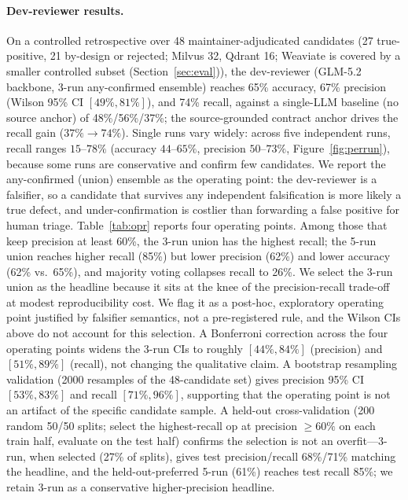 \documentclass[sigconf]{acmart}
\begin{document}
\paragraph{Dev-reviewer results.}
On a controlled retrospective over 48 maintainer-adjudicated candidates (27 true-positive, 21 by-design or rejected; Milvus 32, Qdrant 16; Weaviate is covered by a smaller controlled subset (Section~\ref{sec:eval})), the dev-reviewer (GLM-5.2 backbone, 3-run any-confirmed ensemble) reaches 65\% accuracy, 67\% precision (Wilson 95\% CI $[49\%, 81\%]$), and 74\% recall, against a single-LLM baseline (no source anchor) of 48\%/56\%/37\%; the source-grounded contract anchor drives the recall gain ($37\%\to74\%$). Single runs vary widely: across five independent runs, recall ranges $15$--$78\%$ (accuracy $44$--$65\%$, precision $50$--$73\%$, Figure~\ref{fig:perrun}), because some runs are conservative and confirm few candidates. We report the any-confirmed (union) ensemble as the operating point: the dev-reviewer is a falsifier, so a candidate that survives any independent falsification is more likely a true defect, and under-confirmation is costlier than forwarding a false positive for human triage. Table~\ref{tab:opr} reports four operating points. Among those that keep precision at least 60\%, the 3-run union has the highest recall; the 5-run union reaches higher recall (85\%) but lower precision (62\%) and lower accuracy (62\% vs.\ 65\%), and majority voting collapses recall to 26\%. We select the 3-run union as the headline because it sits at the knee of the precision-recall trade-off at modest reproducibility cost. We flag it as a post-hoc, exploratory operating point justified by falsifier semantics, not a pre-registered rule, and the Wilson CIs above do not account for this selection. A Bonferroni correction across the four operating points widens the 3-run CIs to roughly $[44\%, 84\%]$ (precision) and $[51\%, 89\%]$ (recall), not changing the qualitative claim. A bootstrap resampling validation (2000 resamples of the 48-candidate set) gives precision 95\% CI $[53\%, 83\%]$ and recall $[71\%, 96\%]$, supporting that the operating point is not an artifact of the specific candidate sample. A held-out cross-validation (200 random 50/50 splits; select the highest-recall op at precision $\geq 60\%$ on each train half, evaluate on the test half) confirms the selection is not an overfit---3-run, when selected (27\% of splits), gives test precision/recall 68\%/71\% matching the headline, and the held-out-preferred 5-run (61\%) reaches test recall 85\%; we retain 3-run as a conservative higher-precision headline.
\end{document}
